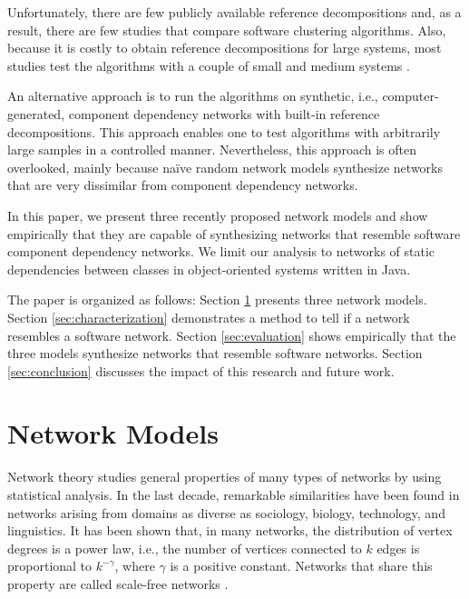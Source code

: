 Unfortunately, there are few publicly available reference decompositions
\cite{Koschke2000} and, as a result, there are few studies that compare software
clustering algorithms. Also, because it is costly to obtain reference
decompositions for large systems, most studies test the algorithms with a couple
of small and medium systems \cite{Anquetil1999,Maqbool2007,Bittencourt2009}.

An alternative approach is to run the algorithms on synthetic, i.e., computer-
generated, component dependency networks with built-in reference decompositions.
This approach enables one to test algorithms with arbitrarily large samples in a
controlled manner. Nevertheless, this approach is often overlooked, mainly
because naïve random network models synthesize networks that are very dissimilar
from component dependency networks.

In this paper, we present three recently proposed network models and show
empirically that they are capable of synthesizing networks that resemble
software component dependency networks. We limit our analysis to networks of
static dependencies between classes in object-oriented systems written in Java.

The paper is organized as follows: Section \ref{sec:models} presents three
network models.
%
Section \ref{sec:characterization} demonstrates a method to tell if a network
resembles a software network.
%
Section \ref{sec:evaluation} shows empirically that the three models synthesize
networks that resemble software networks.
%
Section \ref{sec:conclusion} discusses the impact of this research and future
work.


\section{Network Models} \label{sec:models} 

Network theory studies general properties of many types of networks by using
statistical analysis. In the last decade, remarkable similarities have been
found in networks arising from domains as diverse as sociology, biology,
technology, and linguistics. It has been shown that, in many networks, the
distribution of vertex degrees is a power law, i.e., the number of vertices
connected to $k$ edges is proportional to $k^{-\gamma}$, where $\gamma$ is a
positive constant. Networks that share this property are called scale-free
networks \cite{Barabasi1999}.


